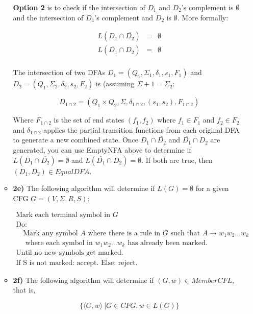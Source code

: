 \documentclass[12pt]{article}
\begin{document}
\begin{enumerate}
\begin{itemize}
\textbf{Option 2} is to check if the intersection of $D_1$ and $D_2$'s complement is $\emptyset$ and the intersection of $D_1$'s complement and $D_2$ is $\emptyset$. More formally:

\[
\begin{array}{lcr}
L(D_1 \cap \overline{D_2}) & = & \emptyset \\
L(\overline{D_1} \cap D_2) & = & \emptyset \\
\end{array} 
\]

The intersection of two DFAs $D_1 = (Q_1, \Sigma_1, \delta_1, s_1, F_1)$ and $D_2 = (Q_1, \Sigma_2, \delta_2, s_2, F_2)$ is (assuming $\Sigma+1 = \Sigma_2: $

\begin{equation*}
D_{1\cap 2} = (Q_1 \times Q_2, \Sigma, \delta_{1\cap 2}, (s_1,s_2), F_{1\cap 2})
\end{equation*}

Where $F_{1\cap 2}$ is the set of end states $(f_1,f_2)$ where $f_1 \in F_1$ and $f_2 \in F_2$ and $\delta_{1\cap2}$ applies the partial transition functions from each original DFA to generate a new combined state. Once $D_1 \cap \overline{D_2}$ and $\overline{D_1} \cap D_2$ are generated, you can use EmptyNFA above to determine if $L(D_1 \cap \overline{D_2}) = \emptyset$ and $L(\overline{D_1} \cap D_2) = \emptyset$. If both are true, then $(D_1,D_2) \in EqualDFA$.

\item \textbf{2e)} The following algorithm will determine if $L(G) = \emptyset$ for a given CFG $G = (V,\Sigma, R, S)$:

\[
\begin{array}{l}
\textrm{Mark each terminal symbol in }G \\
\textrm{Do:} \\
\quad \textrm{Mark any symbol $A$ where there is a rule in $G$ such that }A \rightarrow w_1w_2...w_k \\
\quad \textrm{ where each symbol in $w_1w_2...w_k$ has already been marked.} \\
\textrm{Until no new symbols get marked.} \\
\textrm{If S is not marked: accept. Else: reject.}
\end{array}
\]

\item \textbf{2f)} The following algorithm will determine if $(G,w) \in MemberCFL$, that is,

\begin{equation}
\{\langle G,w\rangle\ | G \in CFG, w \in L(G)\}
\end{equation}


\end{itemize}
\end{enumerate}
\end{document}
